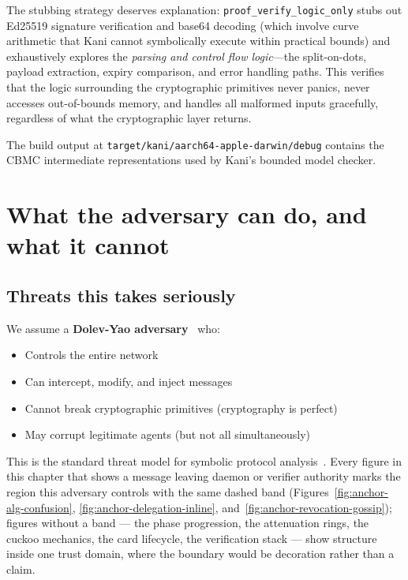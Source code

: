 \documentclass[11pt,a4paper]{article}
\theoremstyle{definition}
\begin{document}
The stubbing strategy deserves explanation: \texttt{proof\_verify\_logic\_only} stubs out Ed25519 signature verification and base64 decoding (which involve curve arithmetic that Kani cannot symbolically execute within practical bounds) and exhaustively explores the \emph{parsing and control flow logic}---the split-on-dots, payload extraction, expiry comparison, and error handling paths. This verifies that the logic surrounding the cryptographic primitives never panics, never accesses out-of-bounds memory, and handles all malformed inputs gracefully, regardless of what the cryptographic layer returns.

The build output at \texttt{target/kani/aarch64-apple-darwin/debug} contains the CBMC intermediate representations used by Kani's bounded model checker.

\section{What the adversary can do, and what it cannot}\label{sec:adversary}

\subsection{Threats this takes seriously}\label{sec:threat-model}

We assume a \textbf{Dolev-Yao adversary}~\cite{dolev1983security} who:
\begin{itemize}
  \item Controls the entire network
  \item Can intercept, modify, and inject messages
  \item Cannot break cryptographic primitives (cryptography is perfect)
  \item May corrupt legitimate agents (but not all simultaneously)
\end{itemize}

This is the standard threat model for symbolic protocol analysis~\cite{blanchet2016modeling}. Every figure in this chapter that shows a message leaving daemon or verifier authority marks the region this adversary controls with the same dashed band (Figures~\ref{fig:anchor-alg-confusion}, \ref{fig:anchor-delegation-inline}, and~\ref{fig:anchor-revocation-gossip}); figures without a band --- the phase progression, the attenuation rings, the cuckoo mechanics, the card lifecycle, the verification stack --- show structure inside one trust domain, where the boundary would be decoration rather than a claim.
\end{document}
